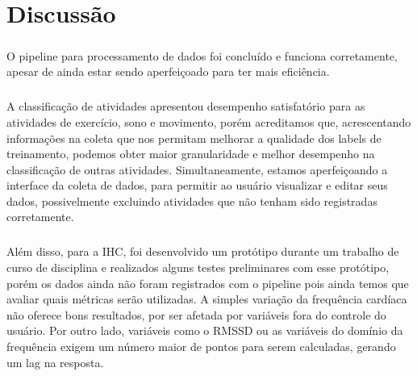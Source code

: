 \chapter{Discussão}
\label{Dicussion}

    \paragraph{} O pipeline para processamento de dados foi concluído e funciona corretamente, apesar de ainda estar sendo aperfeiçoado para ter mais eficiência.

    \paragraph{} A classificação de atividades apresentou desempenho satisfatório para as atividades de exercício, sono e movimento, porém acreditamos que, acrescentando informações na coleta que nos permitam melhorar a qualidade dos labels de treinamento, podemos obter maior granularidade e melhor desempenho na classificação de outras atividades. Simultaneamente, estamos aperfeiçoando a interface da coleta de dados, para permitir ao usuário visualizar e editar seus dados, possivelmente excluindo atividades que não tenham sido registradas corretamente.
    
    \paragraph{} Além disso, para a IHC, foi desenvolvido um protótipo durante um trabalho de curso de disciplina e realizados alguns testes preliminares com esse protótipo, porém os dados ainda não foram registrados com o pipeline pois ainda temos que avaliar quais métricas serão utilizadas. A simples variação da frequência cardíaca não oferece bons resultados, por ser afetada por variáveis fora do controle do usuário. Por outro lado, variáveis como o RMSSD ou as variáveis do domínio da frequência exigem um número maior de pontos para serem calculadas, gerando um lag na resposta.